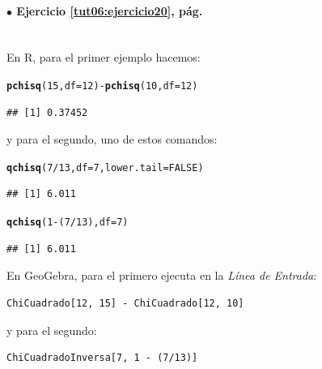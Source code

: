 \documentclass[10pt,a4paper]{article}\usepackage[]{graphicx}\usepackage[]{color}
\makeatletter
\newcommand{\hlnum}[1]{\textcolor[rgb]{0.686,0.059,0.569}{#1}}%
\newcommand{\hlopt}[1]{\textcolor[rgb]{0,0,0}{#1}}%
\newcommand{\hlstd}[1]{\textcolor[rgb]{0.345,0.345,0.345}{#1}}%
\newcommand{\hlkwc}[1]{\textcolor[rgb]{0.333,0.667,0.333}{#1}}%
\newcommand{\hlkwd}[1]{\textcolor[rgb]{0.737,0.353,0.396}{\textbf{#1}}}%
\newenvironment{kframe}{%
 \def\at@end@of@kframe{}%
 \ifinner\ifhmode%
  \def\at@end@of@kframe{\end{minipage}}%
  \begin{minipage}{\columnwidth}%
 \fi\fi%
 \def\FrameCommand##1{\hskip\@totalleftmargin \hskip-\fboxsep
 \colorbox{shadecolor}{##1}\hskip-\fboxsep
     \hskip-\linewidth \hskip-\@totalleftmargin \hskip\columnwidth}%
 \MakeFramed {\advance\hsize-\width
   \@totalleftmargin\z@ \linewidth\hsize
   \@setminipage}}%
 {\par\unskip\endMakeFramed%
 \at@end@of@kframe}
\newenvironment{knitrout}{}{} %
\makeatother
\begin{document}
\paragraph{\bf $\bullet$ Ejercicio \ref{tut06:ejercicio20}, pág. \pageref{tut06:ejercicio20}}
\label{tut06:ejercicio20:sol}\quad\\


En R, para el primer ejemplo hacemos:
\begin{knitrout}
\color{fgcolor}\begin{kframe}
\begin{alltt}
\hlkwd{pchisq}\hlstd{(}\hlnum{15}\hlstd{,} \hlkwc{df}\hlstd{=}\hlnum{12}\hlstd{)} \hlopt{-} \hlkwd{pchisq}\hlstd{(}\hlnum{10}\hlstd{,} \hlkwc{df}\hlstd{=}\hlnum{12}\hlstd{)}
\end{alltt}
\begin{verbatim}
## [1] 0.37452
\end{verbatim}
\end{kframe}
\end{knitrout}
y para el segundo, uno de estos comandos:
\begin{knitrout}
\color{fgcolor}\begin{kframe}
\begin{alltt}
\hlkwd{qchisq}\hlstd{(}\hlnum{7}\hlopt{/}\hlnum{13}\hlstd{,} \hlkwc{df}\hlstd{=}\hlnum{7}\hlstd{,} \hlkwc{lower.tail}\hlstd{=}\hlnum{FALSE}\hlstd{)}
\end{alltt}
\begin{verbatim}
## [1] 6.011
\end{verbatim}
\begin{alltt}
\hlkwd{qchisq}\hlstd{(}\hlnum{1} \hlopt{-} \hlstd{(}\hlnum{7}\hlopt{/}\hlnum{13}\hlstd{),} \hlkwc{df}\hlstd{=}\hlnum{7}\hlstd{)}
\end{alltt}
\begin{verbatim}
## [1] 6.011
\end{verbatim}
\end{kframe}
\end{knitrout}

En GeoGebra, para el primero ejecuta en la {\em Línea de Entrada}:
\begin{verbatim}
ChiCuadrado[12, 15] - ChiCuadrado[12, 10]
\end{verbatim}
y para el segundo:
\begin{verbatim}
ChiCuadradoInversa[7, 1 - (7/13)]
\end{verbatim}
\end{document}
